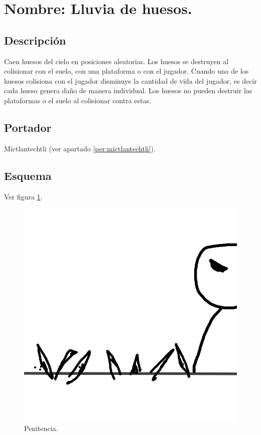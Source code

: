 \section{Nombre: Lluvia de huesos.}\label{hab.LluHuesos}
\subsection{Descripción}
Caen huesos del cielo en posiciones aleatorias. Los huesos se destruyen al colisionar con el suelo, con una plataforma o con el jugador. Cuando una de los huesos colisiona con el jugador disminuye la cantidad de vida del jugador, es decir cada hueso genera daño de manera individual. Los huesos no pueden destruir las plataformas o el suelo al colisionar contra estas.
\subsection{Portador}
Mictlantechtli (ver apartado \ref{per:mictlantechtli}).	
\subsection{Esquema}
			Ver figura \ref{fig:penitencia}.
			\begin{figure}
				\centering
				\includegraphics[height=0.2 \textheight]{Imagenes/penitencia}
				\caption{Penitencia.}
				\label{fig:penitencia}
			\end{figure}
